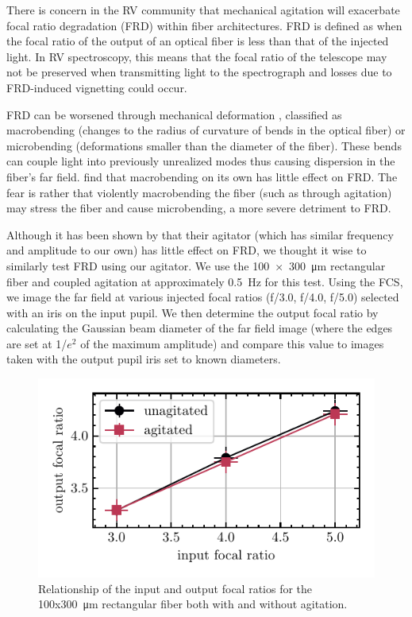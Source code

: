 \documentclass[twocolumn]{emulateapj}
\begin{document}
There is concern in the RV community that mechanical agitation will exacerbate focal ratio degradation (FRD) within fiber architectures. FRD is defined as when the focal ratio of the output of an optical fiber is less than that of the injected light. In RV spectroscopy, this means that the focal ratio of the telescope may not be preserved when transmitting light to the spectrograph and losses due to FRD-induced vignetting could occur.

FRD can be worsened through mechanical deformation \mbox{\citet{Ramsey1988}}, classified as macrobending (changes to the radius of curvature of bends in the optical fiber) or microbending (deformations smaller than the diameter of the fiber). These bends can couple light into previously unrealized modes thus causing dispersion in the fiber's far field. \mbox{\citet{Powell1984, Engelsrath1986, Ramsey1988}} find that macrobending on its own has little effect on FRD. The fear is rather that violently macrobending the fiber (such as through agitation) may stress the fiber and cause microbending, a more severe detriment to FRD.

Although it has been shown by \mbox{\citet{Sablowski2015}} that their agitator (which has similar frequency and amplitude to our own) has little effect on FRD, we thought it wise to similarly test FRD using our agitator. We use the {\SI{100x300}{\micro\meter}} rectangular fiber and coupled agitation at approximately {\SI{0.5}{\hertz}} for this test. Using the FCS, we image the far field at various injected focal ratios (f/3.0, f/4.0, f/5.0) selected with an iris on the input pupil. We then determine the output focal ratio by calculating the Gaussian beam diameter of the far field image (where the edges are set at 1/${e^2}$ of the maximum amplitude) and compare this value to images taken with the output pupil iris set to known diameters.

\begin{figure}
\centering
	\includegraphics[width=\columnwidth]{frd_input_output.pdf}
	\caption{Relationship of the input and output focal ratios for the 100x{\SI{300}{\micro\meter}} rectangular fiber both with and without agitation.}
\label{fig:frd}
\end{figure}
\end{document}

